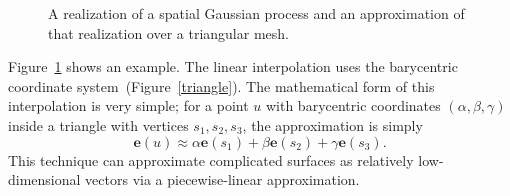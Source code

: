 \documentclass[]{interact}
\begin{document}
\begin{figure}[h!]
\centering
{}

\caption{A realization of a spatial Gaussian process and an
approximation of that realization over a triangular mesh.}
\label{surface}
\end{figure}
Figure~\ref{surface}
shows an example. The linear interpolation uses the barycentric coordinate
system~(Figure~\ref{triangle}). The mathematical form of this interpolation is
very simple; for a point \(u\) with barycentric coordinates \((\alpha, \beta,
\gamma)\) inside a triangle with vertices \(s_{1}, s_{2}, s_{3}\), the
approximation is simply
\begin{equation}
\mathbf{e}(u) \approx \alpha \mathbf{e}(s_{1})
+ \beta \mathbf{e}(s_{2}) + \gamma \mathbf{e}(s_{3}).
\end{equation}
This technique can approximate complicated surfaces as relatively
low-dimensional vectors via a piecewise-linear approximation.
\end{document}
